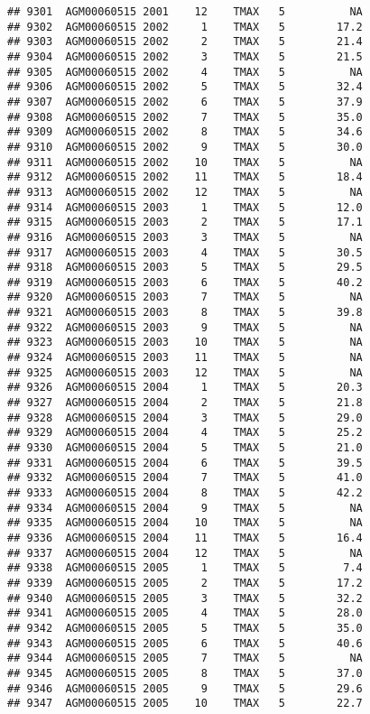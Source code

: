 \documentclass{article}\usepackage[]{graphicx}\usepackage[]{color}
\makeatletter
\newenvironment{kframe}{%
 \def\at@end@of@kframe{}%
 \ifinner\ifhmode%
  \def\at@end@of@kframe{\end{minipage}}%
  \begin{minipage}{\columnwidth}%
 \fi\fi%
 \def\FrameCommand##1{\hskip\@totalleftmargin \hskip-\fboxsep
 \colorbox{shadecolor}{##1}\hskip-\fboxsep
     \hskip-\linewidth \hskip-\@totalleftmargin \hskip\columnwidth}%
 \MakeFramed {\advance\hsize-\width
   \@totalleftmargin\z@ \linewidth\hsize
   \@setminipage}}%
 {\par\unskip\endMakeFramed%
 \at@end@of@kframe}
\newenvironment{knitrout}{}{} %
\makeatother
\begin{document}
\begin{knitrout}
\begin{kframe}
\begin{verbatim}
## 9301  AGM00060515 2001    12    TMAX   5          NA
## 9302  AGM00060515 2002     1    TMAX   5        17.2
## 9303  AGM00060515 2002     2    TMAX   5        21.4
## 9304  AGM00060515 2002     3    TMAX   5        21.5
## 9305  AGM00060515 2002     4    TMAX   5          NA
## 9306  AGM00060515 2002     5    TMAX   5        32.4
## 9307  AGM00060515 2002     6    TMAX   5        37.9
## 9308  AGM00060515 2002     7    TMAX   5        35.0
## 9309  AGM00060515 2002     8    TMAX   5        34.6
## 9310  AGM00060515 2002     9    TMAX   5        30.0
## 9311  AGM00060515 2002    10    TMAX   5          NA
## 9312  AGM00060515 2002    11    TMAX   5        18.4
## 9313  AGM00060515 2002    12    TMAX   5          NA
## 9314  AGM00060515 2003     1    TMAX   5        12.0
## 9315  AGM00060515 2003     2    TMAX   5        17.1
## 9316  AGM00060515 2003     3    TMAX   5          NA
## 9317  AGM00060515 2003     4    TMAX   5        30.5
## 9318  AGM00060515 2003     5    TMAX   5        29.5
## 9319  AGM00060515 2003     6    TMAX   5        40.2
## 9320  AGM00060515 2003     7    TMAX   5          NA
## 9321  AGM00060515 2003     8    TMAX   5        39.8
## 9322  AGM00060515 2003     9    TMAX   5          NA
## 9323  AGM00060515 2003    10    TMAX   5          NA
## 9324  AGM00060515 2003    11    TMAX   5          NA
## 9325  AGM00060515 2003    12    TMAX   5          NA
## 9326  AGM00060515 2004     1    TMAX   5        20.3
## 9327  AGM00060515 2004     2    TMAX   5        21.8
## 9328  AGM00060515 2004     3    TMAX   5        29.0
## 9329  AGM00060515 2004     4    TMAX   5        25.2
## 9330  AGM00060515 2004     5    TMAX   5        21.0
## 9331  AGM00060515 2004     6    TMAX   5        39.5
## 9332  AGM00060515 2004     7    TMAX   5        41.0
## 9333  AGM00060515 2004     8    TMAX   5        42.2
## 9334  AGM00060515 2004     9    TMAX   5          NA
## 9335  AGM00060515 2004    10    TMAX   5          NA
## 9336  AGM00060515 2004    11    TMAX   5        16.4
## 9337  AGM00060515 2004    12    TMAX   5          NA
## 9338  AGM00060515 2005     1    TMAX   5         7.4
## 9339  AGM00060515 2005     2    TMAX   5        17.2
## 9340  AGM00060515 2005     3    TMAX   5        32.2
## 9341  AGM00060515 2005     4    TMAX   5        28.0
## 9342  AGM00060515 2005     5    TMAX   5        35.0
## 9343  AGM00060515 2005     6    TMAX   5        40.6
## 9344  AGM00060515 2005     7    TMAX   5          NA
## 9345  AGM00060515 2005     8    TMAX   5        37.0
## 9346  AGM00060515 2005     9    TMAX   5        29.6
## 9347  AGM00060515 2005    10    TMAX   5        22.7

\end{verbatim}
\end{kframe}
\end{knitrout}
\end{document}
